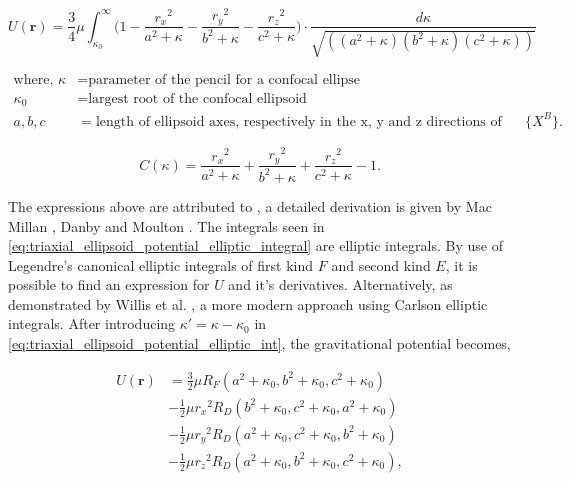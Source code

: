 \begin{equation}
    U(\mathbf{r})=\frac{3}{4}\mu \int_{\kappa_0}^{\infty}\bigg(1-\frac{{r_x}^2}{a^2+\kappa} - \frac{{r_y}^2}{b^2+\kappa} - \frac{{r_z}^2}{c^2+\kappa}\bigg)\cdot{}\frac{d\kappa}{\sqrt{((a^2+\kappa)(b^2+\kappa)(c^2+\kappa))}}
    \label{eq:triaxial_ellipsoid_potential_elliptic_integral}
\end{equation}

\begin{equation*}
    \begin{aligned}
        \textrm{where, }
        \kappa &= \textrm{parameter of the pencil for a confocal ellipse}\\
        \kappa_0 &= \textrm{largest root of the confocal ellipsoid}\\
        a, b, c &= \textrm{length of ellipsoid axes, respectively in the x, y and z directions of the body-fixed frame $\{X^B\}$.}
    \end{aligned}
\end{equation*}

\begin{equation}
    C(\kappa) = \frac{{r_x}^2}{a^2+\kappa} + \frac{{r_y}^2}{b^2+\kappa} + \frac{{r_z}^2}{c^2+\kappa} - 1.
\end{equation}

The expressions above are attributed to \cite{Ivory1809}, a detailed derivation
is given by Mac Millan \cite{MacMillan1958}, Danby \cite{Danby1992} and Moulton
\cite{moulton1970introduction}. The integrals seen in
\autoref{eq:triaxial_ellipsoid_potential_elliptic_integral} are elliptic
integrals. By use of Legendre's canonical elliptic integrals of first kind $F$
and second kind $E$, it is possible to find an expression for $U$ and it's
derivatives. Alternatively, as demonstrated by Willis et al. \cite{Willis2016},
a more modern approach using Carlson elliptic integrals. After introducing
$\kappa'=\kappa-\kappa_0$ in
\autoref{eq:triaxial_ellipsoid_potential_elliptic_int}, the gravitational
potential becomes,

\begin{equation}
    \begin{aligned}
        U(\mathbf{r}) &= \frac{3}{2}\mu{R_F}(a^2+\kappa_0, b^2 + \kappa_0, c^2 + \kappa_0)\\
        &- \frac{1}{2}\mu{{r_x}^2}R_D(b^2 + \kappa_0, c^2+\kappa_0, a^2+\kappa_0)\\
        &- \frac{1}{2}\mu{{r_y}^2}R_D(a^2 + \kappa_0, c^2+\kappa_0, b^2 + \kappa_0)\\
        &- \frac{1}{2}\mu{{r_z}^2}R_D(a^2 + \kappa_0, b^2 + \kappa_0, c^2 + \kappa_0),
    \end{aligned}
\end{equation}


